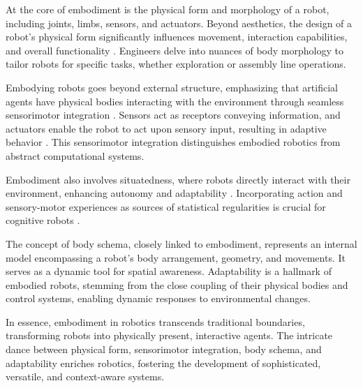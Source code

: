 At the core of embodiment is the physical form and morphology of a robot, including joints, limbs, sensors, and actuators. Beyond aesthetics, the design of a robot's physical form significantly influences movement, interaction capabilities, and overall functionality \cite{Pfeifer2006MorphologicalComputationConnecting}. Engineers delve into nuances of body morphology to tailor robots for specific tasks, whether exploration or assembly line operations.

Embodying robots goes beyond external structure, emphasizing that artificial agents have physical bodies interacting with the environment through seamless sensorimotor integration \cite{Lara2018EmbodiedCognitiveRobotics}. Sensors act as receptors conveying information, and actuators enable the robot to act upon sensory input, resulting in adaptive behavior \cite{Pfeifer2007SelfOrganizationEmbodiment,Der2014RoleEmbodimentSelf}. This sensorimotor integration distinguishes embodied robotics from abstract computational systems.

Embodiment also involves situatedness, where robots directly interact with their environment, enhancing autonomy and adaptability \cite{Brooks1991NewApproachesRobotics}. Incorporating action and sensory-motor experiences as sources of statistical regularities is crucial for cognitive robots \cite{Pezzulo2013ComputationalGroundedCognition}.

The concept of body schema, closely linked to embodiment, represents an internal model encompassing a robot's body arrangement, geometry, and movements. It serves as a dynamic tool for spatial awareness. Adaptability is a hallmark of embodied robots, stemming from the close coupling of their physical bodies and control systems, enabling dynamic responses to environmental changes.

In essence, embodiment in robotics transcends traditional boundaries, transforming robots into physically present, interactive agents. The intricate dance between physical form, sensorimotor integration, body schema, and adaptability enriches robotics, fostering the development of sophisticated, versatile, and context-aware systems.


